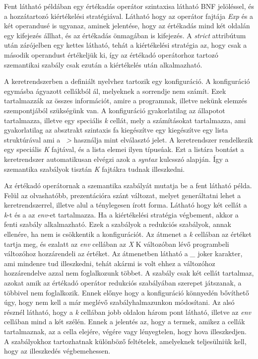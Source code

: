 Fent látható példában egy értékadás operátor szintaxisa látható BNF jelöléssel, és a hozzátartozó kiértékelési stratégiával. Látható hogy az operátor fajtája \textit{Exp} és a két operandusé is ugyanaz, aminek jelentése, hogy az értékadás mind két oldalán egy kifejezés állhat, és az értékadás önmagában is kifejezés. A \textit{strict} attribútum után zárójelben egy kettes látható, tehát a kiértékelési stratégia az, hogy csak a második operandust értékeljük ki, így az értékadó operátorhoz tartozó szemantikai szabály csak ezután a kiértékelés után alkalmazható.



A keretrendszerben a definiált nyelvhez tartozik egy konfiguráció. A konfiguráció egymásba ágyazott cellákból ál, melyeknek a sorrendje nem számít. Ezek tartalmazzák az összes információt, amire a programnak, illetve nekünk elemzés szempontjából szükségünk van. A konfiguráció gyakorlatilag az állapotot tartalmazza, illetve egy speciális \textit{k} cellát, mely a számításokat tartalmazza, ami gyakorlatilag az absztrakt szintaxis fa kiegészítve egy kiegészítve egy lista struktúrával ami a \textit{~>} használja mint elválasztó jelet. A keretrendszer rendelkezik egy speciális \textit{K} fajtával, és a lista elemei ilyen típusúak. Ezt a listára bontást a keretrendszer automatikusan elvégzi azok a \textit{syntax} kulcsszó alapján. Így a szemantika szabályok tisztán \textit{K} fajtákra tudnak illeszkedni.



Az értékadó operátornak a szemantika szabályát mutatja be a fent látható példa. Felül az olvashatóbb, prezentációra szánt változat, melyet generáltatni lehet a keretrendszerrel, illetve alul a ténylegesen írott forma. Látható hogy két cellát a \textit{k}-t és a az \textit{env}-et tartalmazza. Ha a kiértékelési stratégia végbement, akkor a fenti szabály alkalmazható. Ezek a szabályok a redukciós szabályok, annak ellenére, ha nem is csökkentik a konfigurációt. Az átmenet a \textit{k} cellában az értéket tartja meg, és ezalatt az \textit{env} cellában az \textit{X} K változóban lévő programbeli változóhoz hozzárendeli az értéket. Az átmenetben látható a \textit{\_} joker karakter, ami mindenre tud illeszkedni, tehát akármi is volt ehhez a változóhoz hozzárendelve azzal nem foglalkozunk többet. A szabály csak két cellát tartalmaz, azokat amik az értékadó operátor redukciós szabályában szerepet játszanak, a többivel nem foglalkozik. Ennek előnye hogy a konfiguráció könnyedén bővíthető úgy, hogy nem kell a már meglévő szabályhalmazunkon módosítani. Az alsó résznél látható, hogy a \textit{k} cellában jobb oldalon három pont látható, illetve az \textit{env} cellában mind a két szélén. Ennek a jelentés az, hogy a termek, amikez a cellák tartalmaznak, az a cella elejére, végére vagy lényegtelen, hogy hova illeszkedjen. A szabályokhoz tartozhatnak különböző feltételek, amelyeknek teljesülniük kell, hogy az illeszkedés végbemehessen.

